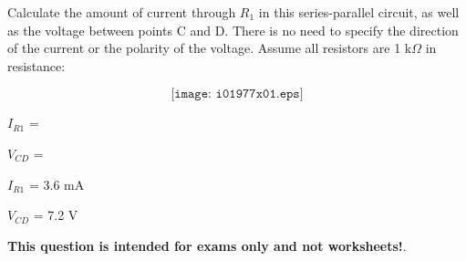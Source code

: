 

Calculate the amount of current through $R_1$ in this series-parallel circuit, as well as the voltage between points C and D.  There is no need to specify the direction of the current or the polarity of the voltage.  Assume all resistors are 1 k$\Omega$ in resistance:

$$\texttt{[image: i01977x01.eps]}$$

$I_{R1}$ = 

\vskip 10pt

$V_{CD}$ = 

\vskip 10pt







$I_{R1}$ = 3.6 mA

\vskip 10pt

$V_{CD}$ = 7.2 V







{\bf This question is intended for exams only and not worksheets!}.


